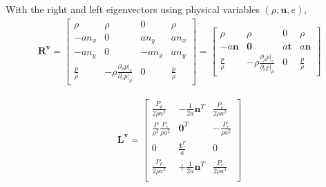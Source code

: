 \documentclass[letterpaper,10pt,english]{jupyterBook}
\begin{document}
\sphinxAtStartPar
With the right and left eigenvectors using physical variables \((\rho, \mathbf{u}, e)\),
\begin{equation*}
\begin{split}
\mathbf{R}^\mathbf{v} =
\begin{bmatrix}
  \rho            & \rho                                                   & 0     & \rho  \\
 -a n_x           & 0                                                      & a n_y & a n_x \\
 -a n_y           & 0                                                      &-a n_x & a n_y \\
  \frac{p}{\rho}  & -\rho \frac{\partial_\rho p|_e}{\partial_e p|_{\rho}}  & 0     & \frac{p}{\rho}
\end{bmatrix}
=
\begin{bmatrix}
  \rho            & \rho                                                   & 0               & \rho  \\
 -a \mathbf{n}    & \mathbf{0}                                             & a \mathbf{t}    & a \mathbf{n} \\
  \frac{p}{\rho}  & -\rho \frac{\partial_\rho p|_e}{\partial_e p|_{\rho}}  & 0               & \frac{p}{\rho}
\end{bmatrix}
\end{split}
\end{equation*}

\begin{equation*}
\begin{split}
\mathbf{L}^\mathbf{v} =
\begin{bmatrix}
 \frac{P_\rho}{2 \rho a^2} & - \frac{1}{2a} \mathbf{n}^T & \frac{P_e}{2 \rho a^2} \\
 \frac{P}{\rho^2} \frac{P_e}{\rho a^2} & \mathbf{0}^T & - \frac{P_e}{\rho a^2} \\
 0 & \frac{\mathbf{t}^T}{a} & 0 \\
 \frac{P_\rho}{2 \rho a^2} & + \frac{1}{2a} \mathbf{n}^T & \frac{P_e}{2 \rho a^2} \\
\end{bmatrix}
\end{split}
\end{equation*}
\end{document}
